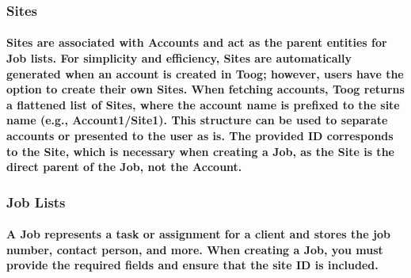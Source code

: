 \documentclass{memoir}
\begin{document}
	\subsubsection{Sites}
	
\paragraph{
	Sites are associated with Accounts and act as the parent entities for Job lists. For simplicity and efficiency, Sites are automatically generated when an account is created in Toog; however, users have the option to create their own Sites. When fetching accounts, Toog returns a flattened list of Sites, where the account name is prefixed to the site name (e.g., Account1/Site1). This structure can be used to separate accounts or presented to the user as is. The provided ID corresponds to the Site, which is necessary when creating a Job, as the Site is the direct parent of the Job, not the Account.
}

	\subsubsection{Job Lists}
	
	\paragraph{
		A Job represents a task or assignment for a client and stores the job number, contact person, and more. When creating a Job, you must provide the required fields and ensure that the site ID is included.
	}
	
	
	
\end{document}

